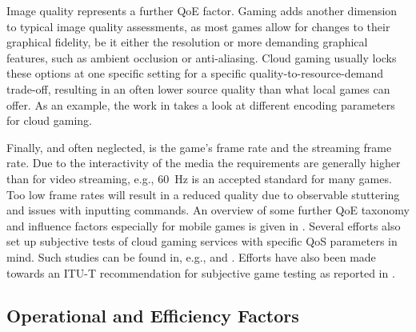 Image quality represents a further \gls{QoE} factor. Gaming adds another dimension to typical image quality assessments, as most games allow for changes to their graphical fidelity, be it either the resolution or more demanding graphical features, such as ambient occlusion or anti-aliasing. Cloud gaming usually locks these options at one specific setting for a specific quality-to-resource-demand trade-off, resulting in an often lower source quality than what local games can offer. As an example, the work in \cite{slivarimpact} takes a look at different encoding parameters for cloud gaming.%

Finally, and often neglected, is the game's frame rate and the streaming frame rate. Due to the interactivity of the media the requirements are generally higher than for video streaming, e.g., \SI{60}{\hertz} is an accepted standard for many games. Too low frame rates will result in a reduced quality due to observable stuttering and issues with inputting commands.
An overview of some further \gls{QoE} taxonomy and influence factors especially for mobile games is given in \cite{beyer2014typedisplaydelayimpact}. Several efforts also set up subjective tests of cloud gaming services with specific \gls{QoS} parameters in mind. Such studies can be found in, e.g., \cite{Jarschel20132883} and  \cite{6614351}. Efforts have also been made towards an \acrshort{ITU-T} recommendation for subjective game testing as reported in \cite{mollertowards}.



\subsection{Operational and Efficiency Factors}


